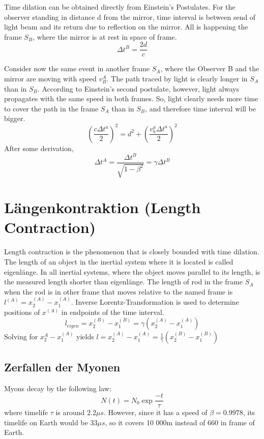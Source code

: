 \documentclass{report}
\begin{document}
Time dilation can be obtained directly from Einstein's Postulates. For the observer standing in distance d from the mirror, time interval is between send of light beam and its return due to reflection on the mirror. All is happening the frame $S_B$, where the mirror is at rest in space of frame.
\begin{equation*}
    \Delta t^B = \frac{2d}{c} 
\end{equation*}

Consider now the same event in another frame $S_A$, where the Observer B and the mirror are moving with speed $v_B^A$. The path traced by light is clearly longer in $S_A$ than in $S_B$. According to Einstein's second postulate, however, light always propagates with the same speed in both frames. So, light clearly needs more time to cover the path in the frame $S_A$ than in $S_B$, and therefore time interval will be bigger.
\begin{equation*}
    \left(\frac{c\Delta t^a}{2}\right)^2 = d^2 + \left(\frac{v_b^a \Delta t^a}{2}\right)^2
\end{equation*}
After some derivation,
\begin{equation*}
    \Delta t^A = \frac{\Delta t^B}{\sqrt{1-\beta^2}} = \gamma \Delta t^B
\end{equation*}

\section{Längenkontraktion (Length Contraction)}
Length contraction is the phenomenon that is closely bounded with time dilation. The length of an object in the inertial system where it is located is called eigenlänge. In all inertial systems, where the object moves parallel to its length, is the measured length shorter than eigenlänge.
The length of rod in the frame $S_A$ when the rod is in other frame that moves relative to the named frame is \( l^{(A)} = x_2^{(A)} - x_1^{(A)}\). Inverse Lorentz-Transformation is used to determine positions of $x^{(A)}$ in endpoints of the time interval.
\[ l_{eigen} = x_2^{(B)} - x_1^{(B)} = \gamma (x_2^{(A)} - x_1^{(A)})\]
Solving for $x_2^{A} - x_1^{(A)}$ yields \(l = x_2^{(A)} - x_1^{(A)} = \frac{1}{\gamma} (x_2^{(B)} - x_1^{(B)})\)
\subsection{Zerfallen der Myonen}
Myons decay by the following law:
\[N(t) = N_0 \exp{\frac{-t}{\tau}}\]
where timelife $\tau$ is around $2.2 \mu s$. However, since it has a speed of $\beta = 0.9978$, its timelife on Earth would be $33 \mu s$, so it covers 10 000m instead of 660 in frame of Earth.
\end{document}
